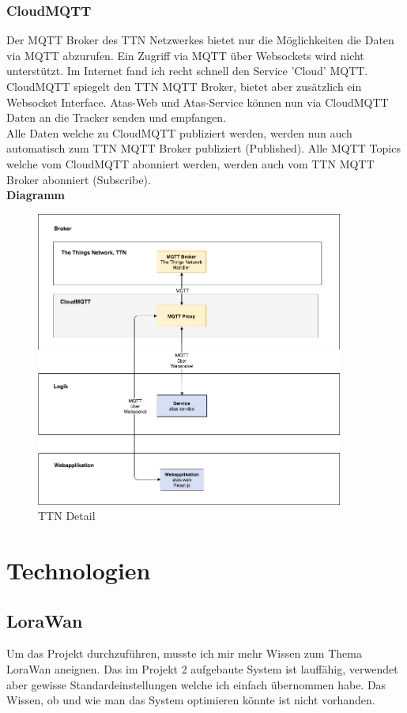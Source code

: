 \documentclass[11pt,english,german]{report}
\theoremstyle{definition}
\begin{document}
\subsection{CloudMQTT}
Der MQTT Broker des TTN Netzwerkes bietet nur die Möglichkeiten die Daten via MQTT abzurufen. Ein Zugriff via MQTT über Websockets wird nicht unterstützt. Im Internet fand ich recht schnell den Service 'Cloud' MQTT.   CloudMQTT spiegelt den TTN MQTT Broker, bietet aber zusätzlich ein Websocket Interface. Atas-Web und Atas-Service können nun via CloudMQTT Daten an die Tracker senden und empfangen.\\[0.3cm]
Alle Daten welche zu CloudMQTT publiziert werden, werden nun auch automatisch zum TTN MQTT Broker publiziert (Published). Alle MQTT Topics welche vom CloudMQTT abonniert werden, werden auch vom TTN MQTT Broker abonniert (Subscribe).  \\[0.3cm]
\textbf{Diagramm}
\begin{figure}[H]
	\centering
	\includegraphics[width=0.9\textwidth]{img/system/ATAS_SystemOverview_CloudMQTT_BA.png}
	\caption[TTN Detail]
	{TTN Detail}
\end{figure}

\newpage
\chapter{Technologien}
\section{LoraWan}
Um das Projekt durchzuführen, musste ich mir mehr Wissen zum Thema LoraWan aneignen. Das im Projekt 2 aufgebaute System ist lauffähig, verwendet aber gewisse Standardeinstellungen welche ich einfach übernommen habe. Das Wissen, ob und wie man das System optimieren könnte ist nicht vorhanden.
\end{document}
